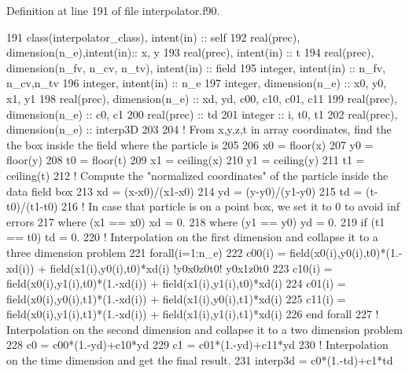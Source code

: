 Definition at line 191 of file interpolator.\+f90.


\begin{DoxyCode}
191     \textcolor{keywordtype}{class}(interpolator\_class), \textcolor{keywordtype}{intent(in)} :: self
192     \textcolor{keywordtype}{real(prec)}, \textcolor{keywordtype}{dimension(n\_e)},\textcolor{keywordtype}{intent(in)}:: x, y
193     \textcolor{keywordtype}{real(prec)}, \textcolor{keywordtype}{intent(in)} :: t
194     \textcolor{keywordtype}{real(prec)}, \textcolor{keywordtype}{dimension(n\_fv, n\_cv, n\_tv)}, \textcolor{keywordtype}{intent(in)} :: field
195     \textcolor{keywordtype}{integer}, \textcolor{keywordtype}{intent(in)} :: n\_fv, n\_cv,n\_tv
196     \textcolor{keywordtype}{integer}, \textcolor{keywordtype}{intent(in)} :: n\_e
197     \textcolor{keywordtype}{integer}, \textcolor{keywordtype}{dimension(n\_e)} :: x0, y0, x1, y1
198     \textcolor{keywordtype}{real(prec)}, \textcolor{keywordtype}{dimension(n\_e)} :: xd, yd, c00, c10, c01, c11
199     \textcolor{keywordtype}{real(prec)}, \textcolor{keywordtype}{dimension(n\_e)} :: c0, c1
200     \textcolor{keywordtype}{real(prec)} :: td
201     \textcolor{keywordtype}{integer} :: i, t0, t1
202     \textcolor{keywordtype}{real(prec)}, \textcolor{keywordtype}{dimension(n\_e)} :: interp3D
203 
204     \textcolor{comment}{! From x,y,z,t in array coordinates, find the the box inside the field where the particle is}
205 
206     x0 = floor(x)
207     y0 = floor(y)
208     t0 = floor(t)
209     x1 = ceiling(x)
210     y1 = ceiling(y)
211     t1 = ceiling(t)
212     \textcolor{comment}{! Compute the "normalized coordinates" of the particle inside the data field box}
213     xd = (x-x0)/(x1-x0)
214     yd = (y-y0)/(y1-y0)
215     td = (t-t0)/(t1-t0)
216     \textcolor{comment}{! In case that particle is on a point box, we set it to 0 to avoid inf errors}
217     \textcolor{keywordflow}{where} (x1 == x0) xd = 0.
218     \textcolor{keywordflow}{where} (y1 == y0) yd = 0.
219     \textcolor{keywordflow}{if} (t1 == t0)    td = 0.
220     \textcolor{comment}{! Interpolation on the first dimension and collapse it to a three dimension problem}
221     \textcolor{keywordflow}{forall}(i=1:n\_e)
222         c00(i) = field(x0(i),y0(i),t0)*(1.-xd(i)) + field(x1(i),y0(i),t0)*xd(i) \textcolor{comment}{!y0x0z0t0!  y0x1z0t0}
223         c10(i) = field(x0(i),y1(i),t0)*(1.-xd(i)) + field(x1(i),y1(i),t0)*xd(i)
224         c01(i) = field(x0(i),y0(i),t1)*(1.-xd(i)) + field(x1(i),y0(i),t1)*xd(i)
225         c11(i) = field(x0(i),y1(i),t1)*(1.-xd(i)) + field(x1(i),y1(i),t1)*xd(i)
226 \textcolor{keywordflow}{    end forall}
227     \textcolor{comment}{! Interpolation on the second dimension and collapse it to a two dimension problem}
228     c0 = c00*(1.-yd)+c10*yd
229     c1 = c01*(1.-yd)+c11*yd
230     \textcolor{comment}{! Interpolation on the time dimension and get the final result.}
231     interp3d = c0*(1.-td)+c1*td
\end{DoxyCode}
\mbox{\label{namespaceinterpolator__mod_ac54a92d43721099e8e5bc5a888d7ee73}} 
